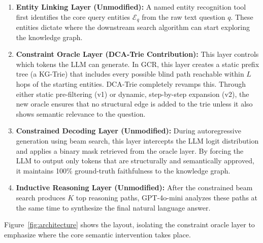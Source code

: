 \begin{enumerate}
  \item \textbf{Entity Linking Layer (Unmodified):} A named entity recognition tool first identifies the core query entities $\mathcal{E}_q$ from the raw text question $q$. These entities dictate where the downstream search algorithm can start exploring the knowledge graph.

  \item \textbf{Constraint Oracle Layer (DCA-Trie Contribution):} This layer controls which tokens the LLM can generate. In GCR, this layer creates a static prefix tree (a KG-Trie) that includes every possible blind path reachable within $L$ hops of the starting entities. DCA-Trie completely revamps this. Through either static pre-filtering (v1) or dynamic, step-by-step expansion (v2), the new oracle ensures that no structural edge is added to the trie unless it also shows semantic relevance to the question.

  \item \textbf{Constrained Decoding Layer (Unmodified):} During autoregressive generation using beam search, this layer intercepts the LLM logit distribution and applies a binary mask retrieved from the oracle layer. By forcing the LLM to output only tokens that are structurally and semantically approved, it maintains 100\% ground-truth faithfulness to the knowledge graph.

  \item \textbf{Inductive Reasoning Layer (Unmodified):} After the constrained beam search produces $K$ top reasoning paths, GPT-4o-mini analyzes these paths at the same time to synthesize the final natural language answer.
\end{enumerate}

Figure~\ref{fig:architecture} shows the layout, isolating the constraint oracle layer to emphasize where the core semantic intervention takes place.


